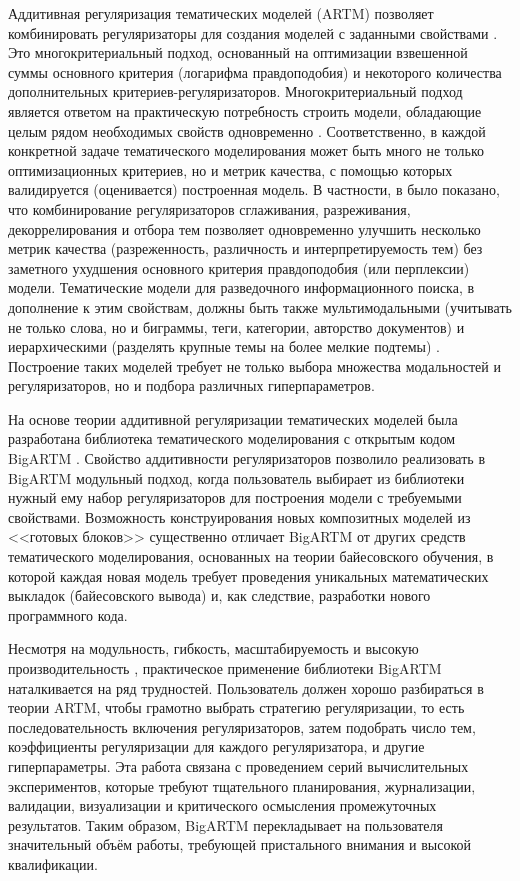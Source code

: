 Аддитивная регуляризация тематических моделей (ARTM) позволяет комбинировать регуляризаторы для создания моделей с заданными свойствами \cite{vorontsov2014additive,voron15mlj}. Это многокритериальный подход, основанный на оптимизации взвешенной суммы основного критерия (логарифма правдоподобия) и некоторого количества дополнительных критериев-регуляризаторов. Многокритериальный подход является ответом на практическую потребность строить модели, обладающие целым рядом необходимых свойств одновременно \cite{kochedykov2017fast}. 
Соответственно, в каждой конкретной задаче тематического моделирования может быть много не только оптимизационных критериев, но и метрик качества, с помощью которых валидируется (оценивается) построенная модель. В частности, в \cite{voron15mlj,voron15mlj} было показано, что комбинирование регуляризаторов сглаживания, разреживания, декоррелирования и отбора тем позволяет одновременно улучшить несколько метрик качества (разреженность, различность и интерпретируемость тем) без заметного ухудшения основного критерия правдоподобия (или перплексии) модели. Тематические модели для разведочного информационного поиска, в дополнение к этим свойствам, должны быть также мультимодальными (учитывать не только слова, но и биграммы, теги, категории, авторство документов) и иерархическими (разделять крупные темы на более мелкие подтемы) \cite{ianina2019regularized}. Построение таких моделей требует не только выбора множества модальностей и регуляризаторов, но и подбора различных гиперпараметров.

На основе теории аддитивной регуляризации тематических моделей
была разработана библиотека тематического моделирования с открытым кодом BigARTM \cite{vorontsov2015bigartm,frei2016parallel}. 
Свойство аддитивности регуляризаторов позволило реализовать в BigARTM модульный подход, когда пользователь выбирает из библиотеки нужный ему набор регуляризаторов для построения модели с требуемыми свойствами. 
Возможность конструирования новых композитных моделей из <<готовых блоков>> существенно отличает BigARTM от других средств тематического моделирования, основанных на теории байесовского обучения, в которой каждая новая модель требует проведения уникальных математических выкладок (байесовского вывода) и, как следствие, разработки нового программного кода. 

Несмотря на модульность, гибкость, масштабируемость и высокую производительность \cite{kochedykov2017fast}, практическое применение библиотеки BigARTM наталкивается на ряд трудностей. Пользователь должен хорошо разбираться в теории ARTM, чтобы грамотно выбрать стратегию регуляризации, то есть последовательность включения регуляризаторов, затем подобрать число тем, коэффициенты регуляризации для каждого регуляризатора, и другие гиперпараметры. Эта работа связана с проведением серий вычислительных экспериментов, которые требуют тщательного планирования, журнализации, валидации, визуализации и критического осмысления промежуточных результатов. Таким образом, BigARTM перекладывает на пользователя значительный объём работы, требующей пристального внимания и высокой квалификации. 

